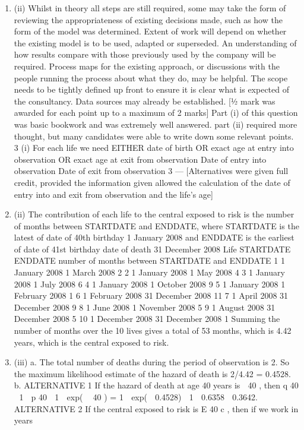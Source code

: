 \documentclass[a4paper,12pt]{article}
\begin{document}
\begin{enumerate}
\item (ii) Whilst in theory all steps are still required, some may take the form of
reviewing the appropriateness of existing decisions made, such as how the
form of the model was determined.
Extent of work will depend on whether the existing model is to be used,
adapted or superseded.
An understanding of how results compare with those previously used by the
company will be required.
Process maps for the existing approach, or discussions with the people running the process about what they do, may be helpful.
The scope needs to be tightly defined up front to ensure it is clear what is expected of the consultancy.
Data sources may already be established.
[1⁄2 mark was awarded for each point up to a maximum of 2 marks]
Part (i) of this question was basic bookwork and was extremely well
answered. part (ii) required more thought, but many candidates were able to
write down some relevant points.
3
(i) For each life we need
EITHER date of birth OR exact age at entry into observation OR exact age at
exit from observation
Date of entry into observation
Date of exit from observation
3  — %
[Alternatives were given full credit, provided the information given allowed the
calculation of the date of entry into and exit from observation and the life’s age]
\item (ii) The contribution of each life to the central exposed to risk is the number of
months between STARTDATE and ENDDATE, where STARTDATE is the
latest of date of 40th birthday 1 January 2008 and ENDDATE is the earliest of
date of 41st birthday date of death 31 December 2008
Life
STARTDATE
ENDDATE
number of months
between
STARTDATE
and ENDDATE
1 1 January 2008 1 March 2008 2
2 1 January 2008 1 May 2008 4
3 1 January 2008 1 July 2008 6
4 1 January 2008 1 October 2008 9
5 1 January 2008 1 February 2008 1
6 1 February 2008 31 December 2008 11
7 1 April 2008 31 December 2008 9
8 1 June 2008 1 November 2008 5
9 1 August 2008 31 December 2008 5
10 1 December 2008 31 December 2008 1
Summing the number of months over the 10 lives gives a total of 53 months,
which is 4.42 years, which is the central exposed to risk.
\item (iii)
a. The total number of deaths during the period of observation is 2. So the
maximum likelihood estimate of the hazard of death is 2/4.42 =
0.4528.
b. ALTERNATIVE 1
If the hazard of death at age 40 years is  40 , then
q 40  1  p 40  1  exp(  40 )
= 1  exp(  0.4528)  1  0.6358  0.3642.
ALTERNATIVE 2
If the central exposed to risk is E 40 c , then if we work in years

\end{enumerate}
\end{document}
